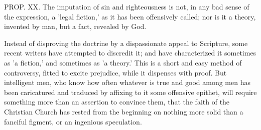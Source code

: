 \documentclass[
]{book}
\begin{document}
PROP. XX. The imputation of sin and righteousness is not, in any bad sense of the expression, a 'legal fiction,' as it has been offensively called; nor is it a theory, invented by man, but a fact, revealed by God.

Instead of disproving the doctrine by a dispassionate appeal to Scripture, some recent writers have attempted to discredit it; and have characterized it sometimes as 'a fiction,' and sometimes as 'a theory.' This is a short and easy method of controversy, fitted to excite prejudice, while it dispenses with proof. But intelligent men, who know how often whatever is true and good among men has been caricatured and traduced by affixing to it some offensive epithet, will require something more than an assertion to convince them, that the faith of the Christian Church has rested from the beginning on nothing more solid than a fanciful figment, or an ingenious speculation.
\end{document}
